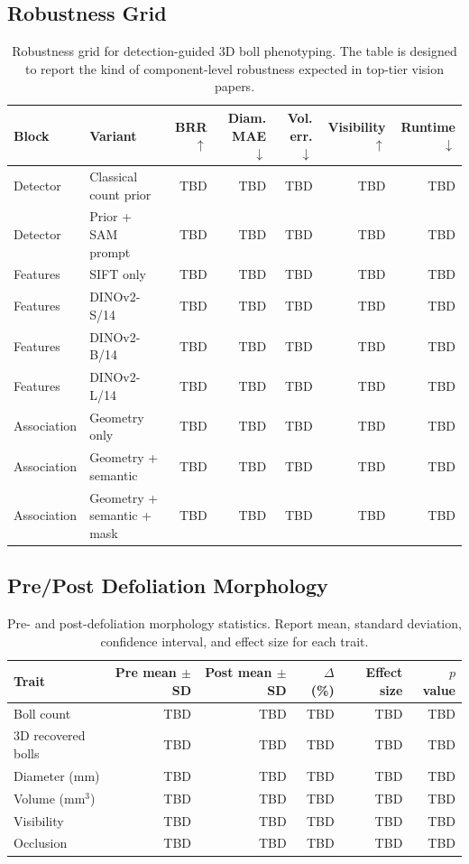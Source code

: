 \subsection{Robustness Grid}

\begin{table}[t]
\centering
\caption{Robustness grid for detection-guided 3D boll phenotyping. The table is designed to report the kind of component-level robustness expected in top-tier vision papers.}
\label{tab:robustness_grid}
\begin{tabular}{llrrrrr}
\toprule
Block & Variant & BRR $\uparrow$ & Diam. MAE $\downarrow$ & Vol. err. $\downarrow$ & Visibility $\uparrow$ & Runtime $\downarrow$ \\
\midrule
Detector & Classical count prior & TBD & TBD & TBD & TBD & TBD \\
Detector & Prior + SAM prompt & TBD & TBD & TBD & TBD & TBD \\
Features & SIFT only & TBD & TBD & TBD & TBD & TBD \\
Features & DINOv2-S/14 & TBD & TBD & TBD & TBD & TBD \\
Features & DINOv2-B/14 & TBD & TBD & TBD & TBD & TBD \\
Features & DINOv2-L/14 & TBD & TBD & TBD & TBD & TBD \\
Association & Geometry only & TBD & TBD & TBD & TBD & TBD \\
Association & Geometry + semantic & TBD & TBD & TBD & TBD & TBD \\
Association & Geometry + semantic + mask & TBD & TBD & TBD & TBD & TBD \\
\bottomrule
\end{tabular}
\end{table}

\subsection{Pre/Post Defoliation Morphology}

\begin{table}[t]
\centering
\caption{Pre- and post-defoliation morphology statistics. Report mean, standard deviation, confidence interval, and effect size for each trait.}
\label{tab:pre_post_morphology}
\begin{tabular}{lrrrrr}
\toprule
Trait & Pre mean $\pm$ SD & Post mean $\pm$ SD & $\Delta$ (\%) & Effect size & $p$ value \\
\midrule
Boll count & TBD & TBD & TBD & TBD & TBD \\
3D recovered bolls & TBD & TBD & TBD & TBD & TBD \\
Diameter (mm) & TBD & TBD & TBD & TBD & TBD \\
Volume (mm$^3$) & TBD & TBD & TBD & TBD & TBD \\
Visibility & TBD & TBD & TBD & TBD & TBD \\
Occlusion & TBD & TBD & TBD & TBD & TBD \\
\bottomrule
\end{tabular}
\end{table}


